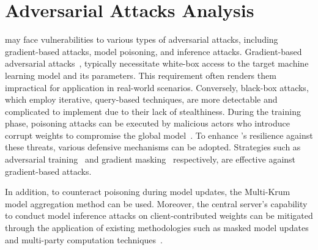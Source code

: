 \section{Adversarial Attacks Analysis}
\label{sec:adversarial}

\Sys may face vulnerabilities to various types of adversarial attacks, including gradient-based attacks, model poisoning, and inference attacks. Gradient-based adversarial attacks~\cite{chakraborty2021survey}, typically necessitate white-box access to the target machine learning model and its parameters. This requirement often renders them impractical for application in real-world scenarios. Conversely, black-box attacks, which employ iterative, query-based techniques, are more detectable and complicated to implement due to their lack of stealthiness. During the training phase, poisoning attacks can be executed by malicious actors who introduce corrupt weights to compromise the global model~\cite{jagielski2018manipulating}. To enhance \Sys's resilience against these threats, various defensive mechanisms can be adopted. Strategies such as adversarial training~\cite{tramer2019adversarial} and gradient masking~\cite{madry2017towards} respectively, are effective against gradient-based attacks. 

In addition, to counteract poisoning during model updates, the Multi-Krum~\cite{munoz2019byzantine} model aggregation method can be used. Moreover, the central server's capability to conduct model inference attacks on client-contributed weights can be mitigated through the application of existing methodologies such as masked model updates and multi-party computation techniques~\cite{kanagavelu2020two}.